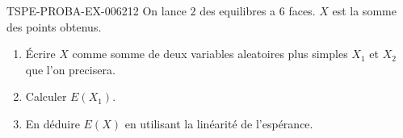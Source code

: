\begin{exercice}{TSPE-PROBA-EX-006}{2}{12}
On lance $2$ des equilibres a $6$ faces. $X$ est la somme des points obtenus.
\begin{enumerate}
  \item Écrire $X$ comme somme de deux variables aleatoires plus simples $X_1$ et $X_2$ que l'on precisera.
  \item Calculer $E(X_1)$.
  \item En déduire $E(X)$ en utilisant la linéarité de l'espérance.
\end{enumerate}
\end{exercice}
